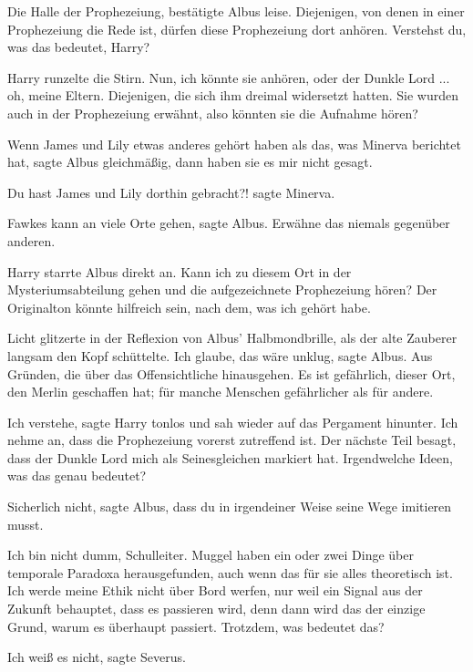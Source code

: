 \glqq Die Halle der Prophezeiung\grqq{}, bestätigte Albus leise. \glqq
Diejenigen, von denen in einer Prophezeiung die Rede ist, dürfen diese
Prophezeiung dort anhören. Verstehst du, was das bedeutet, Harry?\grqq{}

Harry runzelte die Stirn. \glqq Nun, ich könnte sie anhören, oder der Dunkle
Lord ... oh, meine Eltern. Diejenigen, die sich ihm dreimal widersetzt hatten.
Sie wurden auch in der Prophezeiung erwähnt, also könnten sie die Aufnahme
hören?\grqq{}

\glqq Wenn James und Lily etwas anderes gehört haben als das, was Minerva
berichtet hat\grqq{}, sagte Albus gleichmäßig, \glqq dann haben sie es mir nicht
gesagt.\grqq{}

\glqq Du hast James und Lily dorthin gebracht?!\grqq{} sagte Minerva.

\glqq Fawkes kann an viele Orte gehen\grqq{}, sagte Albus. \glqq Erwähne das
niemals gegenüber anderen.\grqq{}

Harry starrte Albus direkt an. \glqq Kann ich zu diesem Ort in der
Mysteriumsabteilung gehen und die aufgezeichnete Prophezeiung hören? Der
Originalton könnte hilfreich sein, nach dem, was ich gehört habe.\grqq{}

Licht glitzerte in der Reflexion von Albus' Halbmondbrille, als der alte
Zauberer langsam den Kopf schüttelte. \glqq Ich glaube, das wäre unklug\grqq{},
sagte Albus. \glqq Aus Gründen, die über das Offensichtliche hinausgehen. Es ist
gefährlich, dieser Ort, den Merlin geschaffen hat; für manche Menschen
gefährlicher als für andere.\grqq{}

\glqq Ich verstehe\grqq{}, sagte Harry tonlos und sah wieder auf das Pergament
hinunter. \glqq Ich nehme an, dass die Prophezeiung vorerst zutreffend ist. Der
nächste Teil besagt, dass der Dunkle Lord mich als Seinesgleichen markiert hat.
Irgendwelche Ideen, was das genau bedeutet?\grqq{}

\glqq Sicherlich nicht\grqq{}, sagte Albus, \glqq dass du in irgendeiner Weise
seine Wege imitieren musst.\grqq{}

\glqq Ich bin nicht dumm, Schulleiter. Muggel haben ein oder zwei Dinge über
temporale Paradoxa herausgefunden, auch wenn das für sie alles theoretisch ist.
Ich werde meine Ethik nicht über Bord werfen, nur weil ein Signal aus der
Zukunft behauptet, dass es passieren wird, denn dann wird das der einzige Grund,
warum es überhaupt passiert. Trotzdem, was bedeutet das?\grqq{}

\glqq Ich weiß es nicht\grqq{}, sagte Severus.

